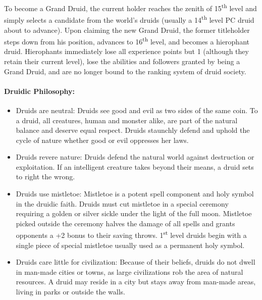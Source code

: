 \begin{multicols}{2}
To become a Grand Druid, the current holder reaches the zenith of 15\textsuperscript{th} level and simply selects a candidate from the world's druids (usually a 14\textsuperscript{th} level PC druid about to advance).  Upon claiming the new Grand Druid, the former titleholder steps down from his position, advances to 16\textsuperscript{th} level, and becomes a hierophant druid.  Hierophants immediately lose all experience points but 1 (although they retain their current level), lose the abilities and followers granted by being a Grand Druid, and are no longer bound to the ranking system of druid society.

\paragraph{Druidic Philosophy:}

\begin{itemize}

\item Druids are neutral: Druids see good and evil as two sides of the same coin.  To a druid, all creatures, human and monster alike, are part of the natural balance and deserve equal respect.  Druids staunchly defend and uphold the cycle of nature whether good or evil oppresses her laws.

\item Druids revere nature: Druids defend the natural world against destruction or exploitation.  If an intelligent creature takes beyond their means, a druid sets to right the wrong.

\item Druids use mistletoe: Mistletoe is a potent spell component and holy symbol in the druidic faith.  Druids must cut mistletoe in a special ceremony requiring a golden or silver sickle under the light of the full moon.  Mistletoe picked outside the ceremony halves the damage of all spells and grants opponents a +2 bonus to their saving throws.  1\textsuperscript{st} level druids begin with a single piece of special mistletoe usually used as a permanent holy symbol.

\item Druids care little for civilization: Because of their beliefs, druids do not dwell in man-made cities or towns, as large civilizations rob the area of natural resources.  A druid may reside in a city but stays away from man-made areas, living in parks or outside the walls.

\end{itemize}


\end{multicols}
